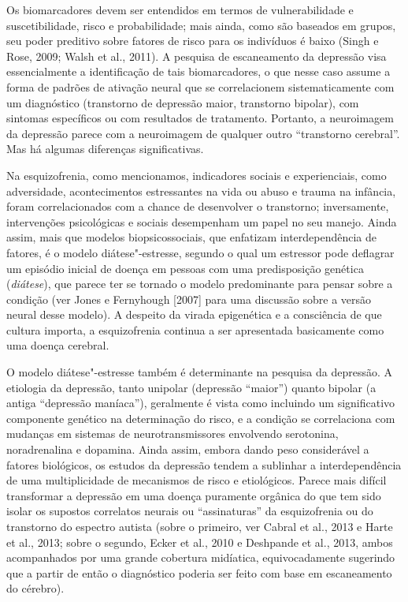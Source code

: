Os biomarcadores devem ser entendidos em termos de vulnerabilidade e
suscetibilidade, risco e probabilidade; mais ainda, como são baseados em
grupos, seu poder preditivo sobre fatores de risco para os indivíduos é
baixo (Singh e Rose, 2009; Walsh et al., 2011). A pesquisa de
escaneamento da depressão visa essencialmente a identificação de tais
biomarcadores, o que nesse caso assume a forma de padrões de ativação
neural que se correlacionem sistematicamente com um diagnóstico
(transtorno de depressão maior, transtorno bipolar), com sintomas
específicos ou com resultados de tratamento. Portanto, a neuroimagem da
depressão parece com a neuroimagem de qualquer outro ``transtorno
cerebral''. Mas há algumas diferenças significativas.

Na esquizofrenia, como mencionamos, indicadores sociais e experienciais,
como adversidade, acontecimentos estressantes na vida ou abuso e trauma
na infância, foram correlacionados com a chance de desenvolver o
transtorno; inversamente, intervenções psicológicas e sociais
desempenham um papel no seu manejo. Ainda assim, mais que modelos
biopsicossociais, que enfatizam interdependência de fatores, é o modelo
diátese"-estresse, segundo o qual um estressor pode deflagrar um episódio
inicial de doença em pessoas com uma predisposição genética
(\emph{diátese}), que parece ter se tornado o modelo predominante para
pensar sobre a condição (ver Jones e Fernyhough {[}2007{]} para uma
discussão sobre a versão neural desse modelo). A despeito da virada
epigenética e a consciência de que cultura importa, a esquizofrenia
continua a ser apresentada basicamente como uma doença cerebral.

O modelo diátese"-estresse também é determinante na pesquisa da
depressão. A etiologia da depressão, tanto unipolar (depressão
``maior'') quanto bipolar (a antiga ``depressão maníaca''), geralmente é
vista como incluindo um significativo componente genético na
determinação do risco, e a condição se correlaciona com mudanças em
sistemas de neurotransmissores envolvendo serotonina, noradrenalina e
dopamina. Ainda assim, embora dando peso considerável a fatores
biológicos, os estudos da depressão tendem a sublinhar a
interdependência de uma multiplicidade de mecanismos de risco e
etiológicos. Parece mais difícil transformar a depressão em uma doença
puramente orgânica do que tem sido isolar os supostos correlatos neurais
ou ``assinaturas'' da esquizofrenia ou do transtorno do espectro autista
(sobre o primeiro, ver Cabral et al., 2013 e Harte et al., 2013; sobre o
segundo, Ecker et al., 2010 e Deshpande et al., 2013, ambos acompanhados
por uma grande cobertura midíatica, equivocadamente sugerindo que a
partir de então o diagnóstico poderia ser feito com base em escaneamento
do cérebro).

